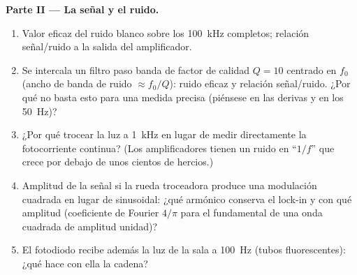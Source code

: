 \begin{problem}
\medskip
\noindent\textbf{Parte II --- La señal y el ruido.}
\begin{enumerate}[resume]
  \item Valor eficaz del ruido blanco sobre los \qty{100}{kHz} completos;
        relación señal/ruido a la salida del amplificador.
  \item Se intercala un filtro paso banda de factor de calidad $Q = 10$
        centrado en $f_0$ (ancho de banda de ruido $\approx f_0/Q$): ruido
        eficaz y relación señal/ruido. ¿Por qué no basta esto para una
        medida precisa (piénsese en las derivas y en los \qty{50}{Hz})?
  \item ¿Por qué trocear la luz a \qty{1}{kHz} en lugar de medir
        directamente la fotocorriente continua? (Los amplificadores tienen
        un ruido en ``$1/f$'' que crece por debajo de unos cientos de
        hercios.)
  \item Amplitud de la señal si la rueda troceadora produce una modulación
        cuadrada en lugar de sinusoidal: ¿qué armónico conserva el lock-in
        y con qué amplitud (coeficiente de Fourier $4/\pi$ para el
        fundamental de una onda cuadrada de amplitud unidad)?
  \item El fotodiodo recibe además la luz de la sala a \qty{100}{Hz}
        (tubos fluorescentes): ¿qué hace con ella la cadena?
\end{enumerate}


\end{problem}
